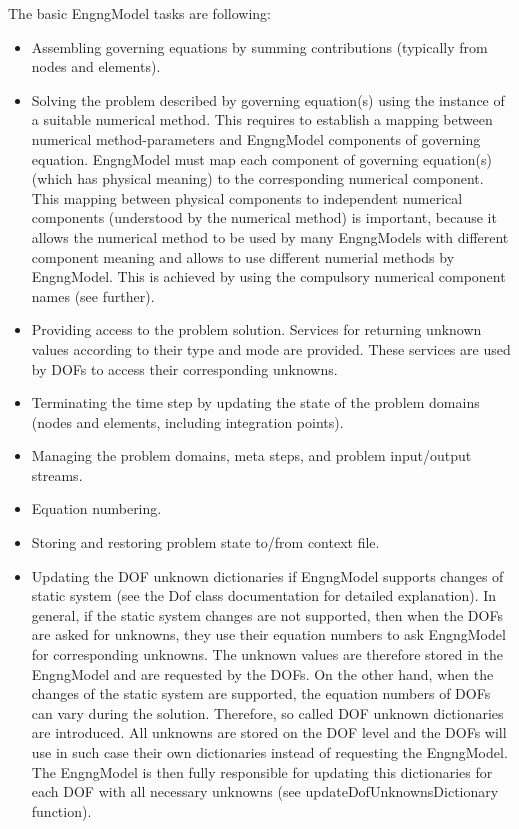 \documentclass[a4paper]{article}
\begin{document}
The basic EngngModel tasks are following:
\begin{itemize}
\item
Assembling governing equations by summing contributions 
(typically from nodes and elements).
\item
Solving the problem described by governing equation(s) using the instance of
a suitable numerical method. This requires to establish a mapping between numerical method-parameters 
and EngngModel components of governing equation.
EngngModel must map each component of governing
equation(s) (which has physical meaning) to the corresponding numerical component.
This mapping between physical components to independent numerical components 
(understood by the numerical method) is important, because it allows
the numerical method to be used by
many EngngModels with different component meaning and allows to use 
different numerial methods by EngngModel. This is achieved by using
the compulsory numerical component names (see further).
\item
Providing access to the problem solution. Services for returning unknown
values according to their type and mode are provided. These services are used by DOFs to 
access their corresponding unknowns.
\item
Terminating the time step by updating the state of the problem domains (nodes and
elements, including integration points).
\item
Managing the problem domains, meta steps, and problem input/output
streams.
\item
Equation numbering.
\item 
Storing and restoring problem state to/from context file.
\item
Updating the DOF unknown dictionaries if EngngModel supports changes of
static system (see the Dof class 
documentation for detailed explanation). In general, if the static system changes are not supported,
then when the DOFs are asked for unknowns, they use their equation numbers to ask EngngModel
for corresponding unknowns. The unknown values are therefore stored in
the EngngModel and are requested by the DOFs.
On the other hand, when the changes of the static system are supported, the equation numbers of DOFs 
can vary during the solution. Therefore, so called DOF unknown dictionaries are introduced.
All unknowns are stored on the DOF level and the DOFs will use in such case their own dictionaries
instead of requesting the EngngModel. The EngngModel is then fully responsible for updating this
dictionaries for each DOF with all necessary unknowns (see updateDofUnknownsDictionary function).
\end{itemize}
\end{document}
